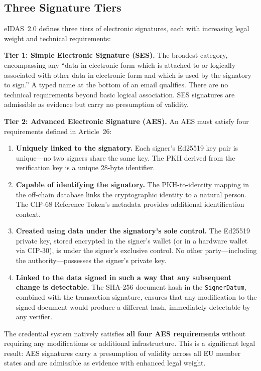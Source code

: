 \subsection{Three Signature Tiers}

eIDAS~2.0 defines three tiers of electronic signatures, each with increasing
legal weight and technical requirements:

\textbf{Tier 1: Simple Electronic Signature (SES).}  The broadest category,
encompassing any ``data in electronic form which is attached to or logically
associated with other data in electronic form and which is used by the
signatory to sign.''  A typed name at the bottom of an email qualifies.
There are no technical requirements beyond basic logical association.  SES
signatures are admissible as evidence but carry no presumption of validity.

\textbf{Tier 2: Advanced Electronic Signature (AES).}  An AES must satisfy
four requirements defined in Article~26:

\begin{enumerate}[nosep]
  \item \textbf{Uniquely linked to the signatory.}  Each signer's Ed25519
    key pair is unique---no two signers share the same key.  The PKH
    derived from the verification key is a unique 28-byte identifier.
  \item \textbf{Capable of identifying the signatory.}  The PKH-to-identity
    mapping in the off-chain database links the cryptographic identity to
    a natural person.  The CIP-68 Reference Token's metadata provides
    additional identification context.
  \item \textbf{Created using data under the signatory's sole control.}
    The Ed25519 private key, stored encrypted in the signer's wallet
    (or in a hardware wallet via CIP-30), is under the signer's exclusive
    control.  No other party---including the authority---possesses the
    signer's private key.
  \item \textbf{Linked to the data signed in such a way that any
    subsequent change is detectable.}  The SHA-256 document hash in the
    \texttt{SignerDatum}, combined with the transaction signature, ensures
    that any modification to the signed document would produce a different
    hash, immediately detectable by any verifier.
\end{enumerate}

The credential system natively satisfies \textbf{all four AES requirements}
without requiring any modifications or additional infrastructure.  This is
a significant legal result: AES signatures carry a presumption of validity
across all EU member states and are admissible as evidence with enhanced
legal weight.

